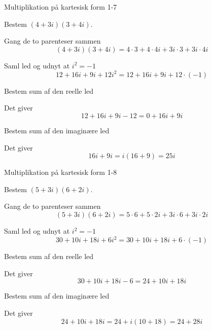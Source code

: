 \documentclass{article}
\begin{document}
\newpage

\begin{exercise}{Multiplikation på kartesisk form 1-7}
	
	Bestem $(4+3i)(3+4i)$.
	
	
	\hint
	
	Gang de to parenteser sammen
	\[
	(4+3i)(3+4i) = 4 \cdot 3 + 4 \cdot 4i + 3i \cdot 3 + 3i \cdot 4i 
	\]
	
	\hint 
	
	Saml led og udnyt at $i^2 = -1$
	\[
	12 + 16i + 9i + 12i^2 = 12+ 16i + 9i + 12 \cdot (-1)
	\]
	
	\hint
	
	Bestem sum af den reelle led
	
	\hint
	
	Det giver
	\[
	12+ 16i + 9i - 12 = 0 + 16i +9i
	\]
	
	\hint
	
	Bestem sum af den imaginære led
	
	
	\hint
	
	Det giver 
	\[
	16i + 9i = i(16+9) = 25i
	\]
	
\end{exercise}

\newpage

\begin{exercise}{Multiplikation på kartesisk form 1-8}
	
	Bestem $(5+3i)(6+2i)$.
	
	
	\hint
	
	Gang de to parenteser sammen
	\[
	(5+3i)(6+2i) = 5 \cdot 6 + 5 \cdot 2i + 3i \cdot 6 + 3i \cdot 2i
	\]
	
	\hint 
	
	Saml led og udnyt at $i^2 = -1$
	\[
	30 + 10i + 18i + 6i^2 = 30 + 10i + 18i + 6 \cdot (-1)
	\]
	
	\hint
	
	Bestem sum af den reelle led
	
	\hint
	
	Det giver
	\[
	30 + 10i + 18i -6 = 24 + 10i + 18i
	\]
	
	\hint
	
	Bestem sum af den imaginære led
	
	
	\hint
	
	Det giver 
	\[
	24 + 10i + 18i = 24 + i(10+18) = 24 + 28i
	\]
	
\end{exercise}
\end{document}
